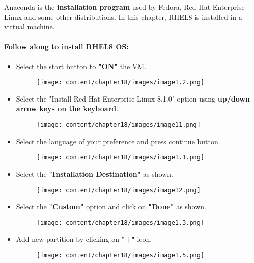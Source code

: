 \setlength{\columnsep}{3pt}
\begin{flushleft}

\bigskip
Anaconda is the \textbf{installation program} used by Fedora, Red Hat Enterprise Linux and some other distributions. In this chapter, RHEL8 is installed in a virtual machine. 

 
\paragraph{Follow along to install RHEL8 OS:}
 
 \begin{itemize}
	\item Select the start button to \textbf{"ON"} the VM.
	 	\begin{figure}[h!]
		\centering
		\texttt{[image: content/chapter18/images/image1.2.png]}
	\end{figure}		
	
	
 	\item Select the "Install Red Hat Enterprise Linux 8.1.0" option using \textbf{up/down arrow keys on the keyboard}.
 	\begin{figure}[h!]
 		\centering
 		\texttt{[image: content/chapter18/images/image11.png]}
 	\end{figure}		


	\item Select the language of your preference and press continue button.
 	\begin{figure}[h!]
		\centering
		\texttt{[image: content/chapter18/images/image1.1.png]}
	\end{figure}		

	\newpage
	
 	\item Select the \textbf{"Installation Destination"} as shown.
	\begin{figure}[h!]
		\centering
		\texttt{[image: content/chapter18/images/image12.png]}
	\end{figure}		

 	\item Select the \textbf{"Custom"} option and click on \textbf{"Done"} as shown.
	\begin{figure}[h!]
		\centering
		\texttt{[image: content/chapter18/images/image1.3.png]}
	\end{figure}
	

 	\item Add new partition by clicking on \textbf{"+"} icon.
	\begin{figure}[h!]
		\centering
		\texttt{[image: content/chapter18/images/image1.5.png]}
	\end{figure}
		

\end{itemize}
\end{flushleft}
